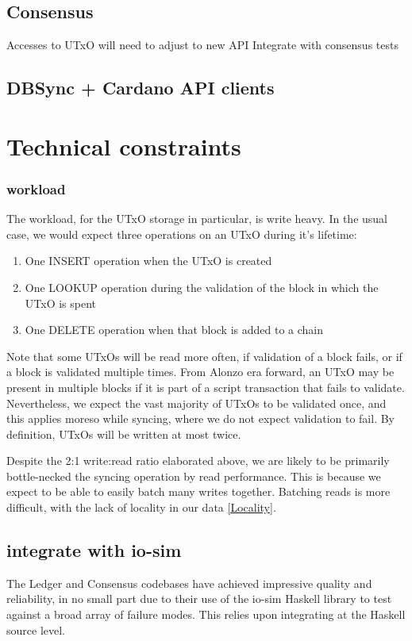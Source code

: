 \documentclass[11pt,a4paper]{article}
\begin{document}
\subsection{Consensus}

Accesses to UTxO will need to adjust to new API
Integrate with consensus tests


\subsection{DBSync + Cardano API clients}

\section{Technical constraints}
\label{constraints}

\subsubsection{workload}
\label{workload}
The workload, for the UTxO storage in particular, is write heavy. In the usual
case, we would expect three operations on an UTxO during it's lifetime:

\begin{enumerate}
\item One INSERT operation when the UTxO is created
\item One LOOKUP operation during the validation of the block in which the UTxO is spent
\item One DELETE operation when that block is added to a chain
\end{enumerate}

Note that some UTxOs will be read more often, if validation of a block fails, or
if a block is validated multiple times. From Alonzo era forward, an UTxO may be
present in multiple blocks if it is part of a script transaction that fails to
validate. Nevertheless, we expect the vast majority of UTxOs to be validated
once, and this applies moreso while syncing, where we do not expect validation
to fail. By definition, UTxOs will be written at most twice.

Despite the 2:1 write:read ratio elaborated above, we are likely to be primarily
bottle-necked the syncing operation by read performance. This is because we
expect to be able to easily batch many writes together. Batching reads is more
difficult, with the lack of locality in our data \ref{Locality}.

\subsection{integrate with io-sim}
\label{io-sim}
The Ledger and Consensus codebases have achieved impressive quality
and reliability, in no small part due to their use of the io-sim
Haskell library to test against a broad array of failure modes. This
relies upon integrating at the Haskell source level.
\end{document}
